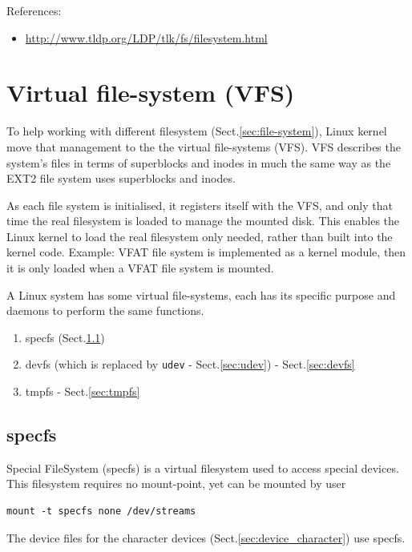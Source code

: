 References:
\begin{itemize}
  \item \url{http://www.tldp.org/LDP/tlk/fs/filesystem.html}
\end{itemize}
  


\section{Virtual file-system (VFS)}
\label{sec:virtual-filesystem}


To help working with different filesystem (Sect.\ref{sec:file-system}), Linux
kernel move that management to the the virtual file-systems (VFS).
VFS describes the system's files in terms of superblocks and inodes in much the
same way as the EXT2 file system uses superblocks and inodes. 

As each file system is initialised, it registers itself with the VFS, and only
that time the real filesystem is loaded to manage the mounted disk. This enables
the Linux kernel to load the real filesystem only needed, rather than built into
the kernel code.
Example: VFAT file system is implemented as a kernel module, then it is only
loaded when a VFAT file system is mounted.


A Linux system has some virtual file-systems, each has its
specific purpose and daemons to perform the same functions.
\begin{enumerate}
  \item specfs (Sect.\ref{sec:specfs})
  \item devfs (which is replaced by \verb!udev! - Sect.\ref{sec:udev}) -
  Sect.\ref{sec:devfs}
  \item tmpfs - Sect.\ref{sec:tmpfs}
\end{enumerate}
   
\subsection{specfs}
\label{sec:specfs}

Special FileSystem (specfs) is a virtual filesystem used to access special
devices. This filesystem requires no mount-point, yet can be mounted by user
\begin{verbatim}
mount -t specfs none /dev/streams
\end{verbatim}
The device files for the character devices (Sect.\ref{sec:device_character}) use
specfs.

